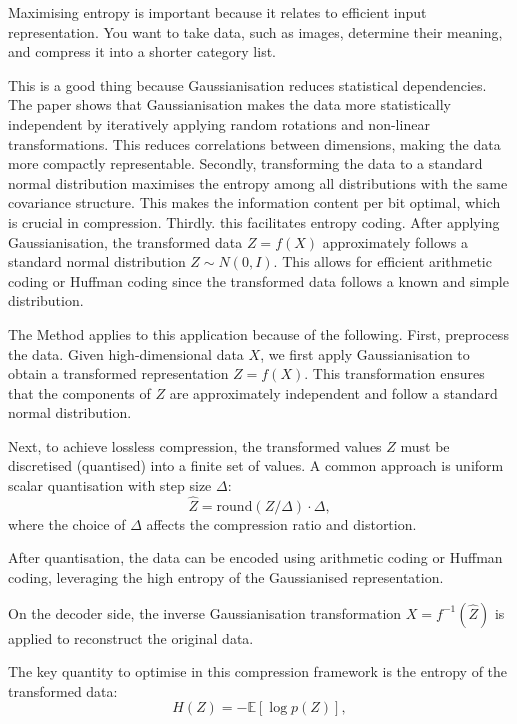 Maximising entropy is important because it relates to efficient input representation. You want to take data, such as images, determine their meaning, and compress it into a shorter category list.

This is a good thing because Gaussianisation reduces statistical dependencies. The paper shows that Gaussianisation makes the data more statistically independent by iteratively applying random rotations and non-linear transformations. This reduces correlations between dimensions, making the data more compactly representable. Secondly, transforming the data to a standard normal distribution maximises the entropy among all distributions with the same covariance structure. This makes the information content per bit optimal, which is crucial in compression. Thirdly. this facilitates entropy coding. After applying Gaussianisation, the transformed data $Z = f(X)$ approximately follows a standard normal distribution $Z \sim N(0, I)$. This allows for efficient arithmetic coding or Huffman coding since the transformed data follows a known and simple distribution.

The Method applies to this application because of the following. First, preprocess the data. Given high-dimensional data $X$, we first apply Gaussianisation to obtain a transformed representation $Z = f(X)$.
This transformation ensures that the components of $Z$ are approximately independent and follow a standard normal distribution.

Next, to achieve lossless compression, the transformed values $Z$ must be discretised (quantised) into a finite set of values. A common approach is uniform scalar quantisation with step size $\Delta$:
    \begin{equation}
    \hat{Z} = \text{round}(Z / \Delta) \cdot \Delta,
    \end{equation}
\noindent where the choice of $\Delta$ affects the compression ratio and distortion.

After quantisation, the data can be encoded using arithmetic coding or Huffman coding, leveraging the high entropy of the Gaussianised representation.

On the decoder side, the inverse Gaussianisation transformation $X = f^{-1}(\hat{Z})$ is applied to reconstruct the original data.

The key quantity to optimise in this compression framework is the entropy of the transformed data:
\begin{equation}
H(Z) = - \mathbb{E} [\log p(Z)],
\end{equation}

